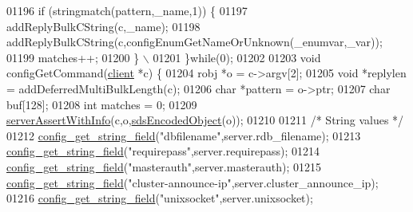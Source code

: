 \begin{DoxyCode}
{{{{{{{{{{01196     \textcolor{keywordflow}{if} \textcolor{preprocessor}{(}\textcolor{preprocessor}{stringmatch}\textcolor{preprocessor}{(}\textcolor{preprocessor}{pattern}\textcolor{preprocessor}{,}\textcolor{preprocessor}{\_name}\textcolor{preprocessor}{,}1\textcolor{preprocessor}{)}\textcolor{preprocessor}{)} \textcolor{preprocessor}{\{}
01197         \textcolor{preprocessor}{addReplyBulkCString}\textcolor{preprocessor}{(}\textcolor{preprocessor}{c}\textcolor{preprocessor}{,}\textcolor{preprocessor}{\_name}\textcolor{preprocessor}{)}\textcolor{preprocessor}{;}
01198         \textcolor{preprocessor}{addReplyBulkCString}\textcolor{preprocessor}{(}\textcolor{preprocessor}{c}\textcolor{preprocessor}{,}\textcolor{preprocessor}{configEnumGetNameOrUnknown}\textcolor{preprocessor}{(}\textcolor{preprocessor}{\_enumvar}\textcolor{preprocessor}{,}\textcolor{preprocessor}{\_var}\textcolor{preprocessor}{)}\textcolor{preprocessor}{)}\textcolor{preprocessor}{;}
01199         \textcolor{preprocessor}{matches}\textcolor{preprocessor}{++}\textcolor{preprocessor}{;}
01200     \textcolor{preprocessor}{\}} \textcolor{preprocessor}{\(\backslash\)}
01201 \textcolor{preprocessor}{\}}\textcolor{keywordflow}{while}\textcolor{preprocessor}{(}0\textcolor{preprocessor}{)}\textcolor{preprocessor}{;}
01202 
01203 \textcolor{keywordtype}{void} configGetCommand(\hyperlink{structclient}{client} *c) \{
01204     robj *o = c->argv[2];
01205     \textcolor{keywordtype}{void} *replylen = addDeferredMultiBulkLength(c);
01206     \textcolor{keywordtype}{char} *pattern = o->ptr;
01207     \textcolor{keywordtype}{char} buf[128];
01208     \textcolor{keywordtype}{int} matches = 0;
01209     \hyperlink{server_8h_a7308f76cbff9a8d3797fe78190b91282}{serverAssertWithInfo}(c,o,\hyperlink{server_8h_afcfb5bd97af52d1dbce331745cae030c}{sdsEncodedObject}(o));
01210 
01211     \textcolor{comment}{/* String values */}
01212     \hyperlink{config_8c_a88a85229639d42e707850d558522da27}{config\_get\_string\_field}(\textcolor{stringliteral}{"dbfilename"},server.rdb\_filename);
01213     \hyperlink{config_8c_a88a85229639d42e707850d558522da27}{config\_get\_string\_field}(\textcolor{stringliteral}{"requirepass"},server.requirepass);
01214     \hyperlink{config_8c_a88a85229639d42e707850d558522da27}{config\_get\_string\_field}(\textcolor{stringliteral}{"masterauth"},server.masterauth);
01215     \hyperlink{config_8c_a88a85229639d42e707850d558522da27}{config\_get\_string\_field}(\textcolor{stringliteral}{"cluster-announce-ip"},server.cluster\_announce\_ip);
01216     \hyperlink{config_8c_a88a85229639d42e707850d558522da27}{config\_get\_string\_field}(\textcolor{stringliteral}{"unixsocket"},server.unixsocket);
}}}}}}}}}}
\end{DoxyCode}
